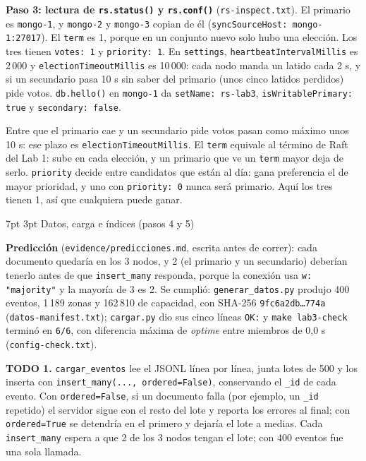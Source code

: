 \documentclass[10pt,letterpaper]{article}
\makeatletter
\renewcommand\section{\@startsection{section}{1}{\z@}%
  {7pt \@plus 2pt \@minus 1pt}{3pt}%
  {\normalfont\normalsize\bfseries\color{acc}}}
\makeatother
\begin{document}
\textbf{Paso 3: lectura de \texttt{rs.status()} y \texttt{rs.conf()}} (\texttt{rs-inspect.txt}).
El primario es \texttt{mongo-1}, y \texttt{mongo-2} y \texttt{mongo-3} copian de él
(\texttt{syncSourceHost: mongo-1:27017}). El \texttt{term} es 1, porque en un conjunto nuevo solo hubo
una elección. Los tres tienen \texttt{votes: 1} y \texttt{priority: 1}. En \texttt{settings},
\texttt{heartbeatIntervalMillis} es 2\,000 y \texttt{electionTimeoutMillis} es 10\,000: cada nodo manda un
latido cada 2 s, y si un secundario pasa 10 s sin saber del primario (unos cinco latidos perdidos) pide
votos. \texttt{db.hello()} en \texttt{mongo-1} da \texttt{setName: rs-lab3},
\texttt{isWritablePrimary: true} y \texttt{secondary: false}.

Entre que el primario cae y un secundario pide votos pasan como máximo unos 10 s: ese plazo es
\texttt{electionTimeoutMillis}. El \texttt{term} equivale al término de Raft del Lab 1: sube en cada
elección, y un primario que ve un \texttt{term} mayor deja de serlo. \texttt{priority} decide entre
candidatos que están al día: gana preferencia el de mayor prioridad, y uno con \texttt{priority: 0} nunca
será primario. Aquí los tres tienen 1, así que cualquiera puede ganar.

\section{Datos, carga e índices (pasos 4 y 5)}

\textbf{Predicción} (\texttt{evidence/predicciones.md}, escrita antes de correr): cada documento quedaría
en los 3 nodos, y 2 (el primario y un secundario) deberían tenerlo antes de que \texttt{insert\_many}
responda, porque la conexión usa \texttt{w: "majority"} y la mayoría de 3 es 2. Se cumplió:
\texttt{generar\_datos.py} produjo 400 eventos, 1\,189 zonas y 162\,810 de capacidad, con SHA-256
\texttt{9fc6a2db\ldots 774a} (\texttt{datos-manifest.txt}); \texttt{cargar.py} dio sus cinco líneas
\texttt{OK:} y \texttt{make lab3-check} terminó en \texttt{6/6}, con diferencia máxima de \emph{optime}
entre miembros de 0,0 s (\texttt{config-check.txt}).

\textbf{TODO 1.} \texttt{cargar\_eventos} lee el JSONL línea por línea, junta lotes de 500 y los inserta
con \texttt{insert\_many(..., ordered=False)}, conservando el \texttt{\_id} de cada evento. Con
\texttt{ordered=False}, si un documento falla (por ejemplo, un \texttt{\_id} repetido) el servidor sigue
con el resto del lote y reporta los errores al final; con \texttt{ordered=True} se detendría en el primero y
dejaría el lote a medias. Cada \texttt{insert\_many} espera a que 2 de los 3 nodos tengan el lote; con 400
eventos fue una sola llamada.
\end{document}
